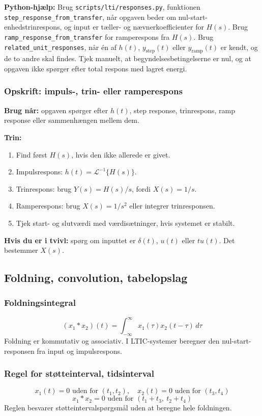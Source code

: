 \textbf{Python-hjælp:} Brug \texttt{scripts/lti/responses.py}, funktionen \texttt{step\_response\_from\_transfer}, når opgaven beder om nul-start-enhedstrinrespons, og input er tæller- og nævnerkoefficienter for \(H(s)\). Brug \texttt{ramp\_response\_from\_transfer} for ramperespons fra \(H(s)\). Brug \texttt{related\_unit\_responses}, når én af \(h(t)\), \(y_{\mathrm{step}}(t)\) eller \(y_{\mathrm{ramp}}(t)\) er kendt, og de to andre skal findes. Tjek manuelt, at begyndelsesbetingelserne er nul, og at opgaven ikke spørger efter total respons med lagret energi.

\subsubsection{Opskrift: impuls-, trin- eller ramperespons}
\textbf{Brug når:} opgaven spørger efter \(h(t)\), step response, trinrespons, ramp response eller sammenhængen mellem dem.

\textbf{Trin:}
\begin{enumerate}
    \item Find først \(H(s)\), hvis den ikke allerede er givet.
    \item Impulsrespons: \(h(t)=\mathcal{L}^{-1}\{H(s)\}\).
    \item Trinrespons: brug \(Y(s)=H(s)/s\), fordi \(X(s)=1/s\).
    \item Ramperespons: brug \(X(s)=1/s^2\) eller integrer trinresponsen.
    \item Tjek start- og slutværdi med værdisætninger, hvis systemet er stabilt.
\end{enumerate}

\textbf{Hvis du er i tvivl:} spørg om inputtet er \(\delta(t)\), \(u(t)\) eller \(t u(t)\). Det bestemmer \(X(s)\).

\subsection{Foldning, convolution, tabelopslag}

\subsubsection{Foldningsintegral}
\[
(x_1*x_2)(t)=\int_{-\infty}^{\infty}x_1(\tau)x_2(t-\tau)\,d\tau
\]
Foldning er kommutativ og associativ. I LTIC-systemer beregner den nul-start-responsen fra input og impulsrespons.

\subsubsection{Regel for støtteinterval, tidsinterval}
\[
x_1(t)=0\text{ uden for }(t_1,t_2),\quad x_2(t)=0\text{ uden for }(t_3,t_4)
\]
\[
x_1*x_2=0\text{ uden for }(t_1+t_3,\ t_2+t_4)
\]
Reglen besvarer støtteintervalspørgsmål uden at beregne hele foldningen.


